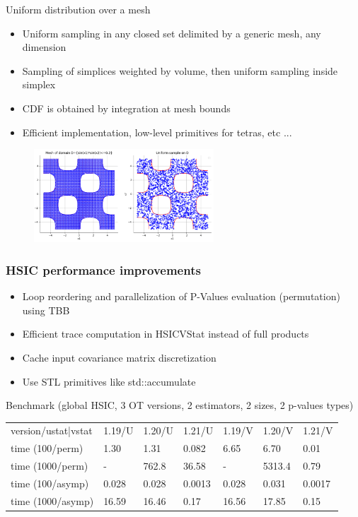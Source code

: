 \documentclass[aspectratio=169]{beamer}
\begin{document}
\begin{frame}{Uniform distribution over a mesh}
\begin{itemize}
\item Uniform sampling in any closed set delimited by a generic mesh, any dimension
\item Sampling of simplices weighted by volume, then uniform sampling inside simplex
\item CDF is obtained by integration at mesh bounds
\item Efficient implementation, low-level primitives for tetras, etc ...
\end{itemize}
\begin{figure}
   \includegraphics[width=0.6\textwidth]{figures/UniformOverMesh}
\end{figure}
\end{frame}


\begin{frame}
\frametitle{HSIC performance improvements}
\begin{itemize}
\item Loop reordering and parallelization of P-Values evaluation (permutation) using TBB
\item Efficient trace computation in HSICVStat instead of full products
\item Cache input covariance matrix discretization
\item Use STL primitives like std::accumulate
\end{itemize}

\vspace{6pt}

\begin{block}{Benchmark (global HSIC, 3 OT versions, 2 estimators, 2 sizes, 2 p-values types)}
\begin{tabular}{lllllll}
version/ustat|vstat & 1.19/U & 1.20/U & 1.21/U & 1.19/V & 1.20/V & 1.21/V \\
time (100/perm) & 1.30 & 1.31 & 0.082 & 6.65 & 6.70 & 0.01\\
time (1000/perm) & - & 762.8 & 36.58 & - & 5313.4 & 0.79\\
time (100/asymp) & 0.028 & 0.028 & 0.0013 & 0.028 & 0.031 & 0.0017\\
time (1000/asymp) & 16.59 & 16.46 & 0.17 & 16.56 & 17.85 & 0.15\\
\end{tabular}
\end{block}

\end{frame}
\end{document}
